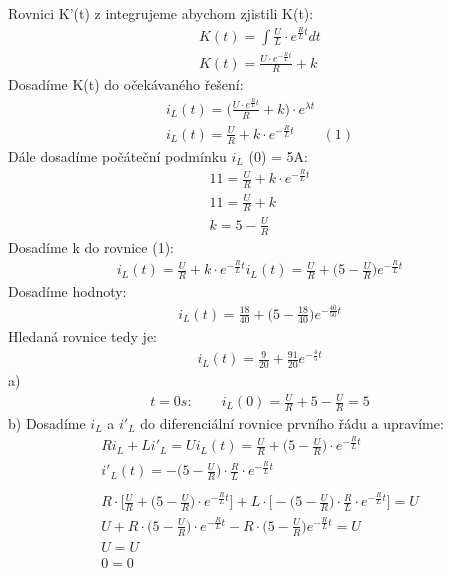 Rovnici K'(t) z integrujeme abychom zjistili K(t):
\begin{gather*}
    K(t) = \int \frac{U}{L} \cdot e^{\frac{R}{L}t}dt\\
    K(t) = \frac{U \cdot e^{-\frac{R}{L}t}}{R} + k
\end{gather*}
Dosadíme K(t) do očekávaného řešení:
\begin{gather*}
    i_L (t) = \bigg( \frac{U \cdot e^{\frac{R}{L}t}}{R} + k \bigg) \cdot e^{\lambda t}\\
    i_L (t) = \frac{U}{R} + k \cdot e^{-\frac{R}{L}t} \qquad (1)
\end{gather*}
Dále dosadíme počáteční podmínku ${i_L}$ (0) = 5A:
\begin{gather*}
    11 = \frac{U}{R} + k \cdot e^{-\frac{R}{L}t}\\
    11 = \frac{U}{R} + k\\
    k  = 5 - \frac{U}{R} 
\end{gather*}
Dosadíme k do rovnice (1):
\begin{gather*}
    i_L (t) = \frac{U}{R} + k \cdot e^{-\frac{R}{L}t}
    i_L (t) = \frac{U}{R} + \bigg( 5 - \frac{U}{R} \bigg) e^{-\frac{R}{L}t}
\end{gather*}
Dosadíme hodnoty:
\begin{gather*}
    i_L (t) = \frac{18}{40} + \bigg( 5 - \frac{18}{40} \bigg) e^{-\frac{40}{50}t}
\end{gather*}
Hledaná rovnice tedy je:
\begin{gather*}
    i_L (t) = \frac{9}{20} + \frac{91}{20} e^{-\frac{4}{5}t}
\end{gather*}
a)
\begin{gather*}
    t = 0s : \qquad i_L (0) = \frac{U}{R} + 5 - \frac{U}{R} = 5
\end{gather*}
b) Dosadíme ${i_L}$ a ${i'_L}$ do diferenciální rovnice prvního řádu a upravíme:
\begin{gather*}
    Ri_L + Li'_L = U
    i_L (t) = \frac{U}{R} + \bigg( 5 - \frac{U}{R} \bigg) \cdot e^{-\frac{R}{L}t}\\
    i'_L(t) = - \bigg( 5 - \frac{U}{R} \bigg) \cdot \frac{R}{L} \cdot e^{-\frac{R}{L}t}\\\\
    R \cdot \bigg[ \frac{U}{R} + \bigg( 5 - \frac{U}{R} \bigg) \cdot e^{-\frac{R}{L}t} \bigg] + L \cdot \bigg[ - \bigg( 5 - \frac{U}{R} \bigg) \cdot \frac{R}{L} \cdot e^{-\frac{R}{L}t} \bigg] = U\\
    U + R \cdot \bigg( 5 - \frac{U}{R} \bigg) \cdot e^{-\frac{R}{L}t} - R \cdot \bigg( 5 - \frac{U}{R} \bigg) e^{-\frac{R}{L}t} = U\\
    U = U\\
    0 = 0
\end{gather*}